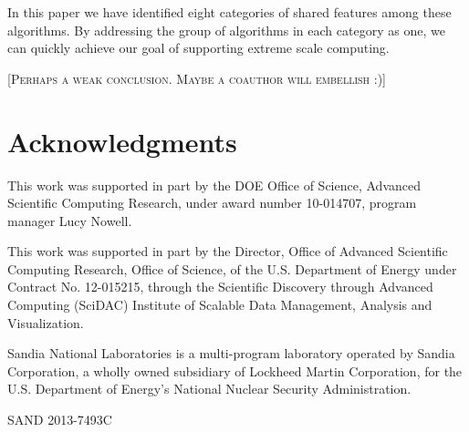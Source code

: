 \documentclass{sig-alternate}
\newcommand{\fix}[1]{{\color{red}\textsc{[#1]}}}
\begin{document}
In this paper we have identified eight categories of shared features among
these algorithms. By addressing the group of algorithms in each category as
one, we can quickly achieve our goal of supporting extreme scale computing.

\fix{Perhaps a weak conclusion. Maybe a coauthor will embellish :)}


\section{Acknowledgments}

\noindent
This work was supported in part by the DOE Office of Science, Advanced
Scientific Computing Research, under award number 10-014707, program
manager Lucy Nowell.

This work was supported in part by the Director, Office of Advanced
Scientific Computing Research, Office of Science, of the U.S. Department of
Energy under Contract No. 12-015215, through the Scientific Discovery
through Advanced Computing (SciDAC) Institute of Scalable Data Management,
Analysis and Visualization.

Sandia National Laboratories is a multi-program laboratory operated by
Sandia Corporation, a wholly owned subsidiary of Lockheed Martin
Corporation, for the U.S. Department of Energy's National Nuclear Security
Administration.

\noindent
{\small SAND 2013-7493C}




\end{document}

